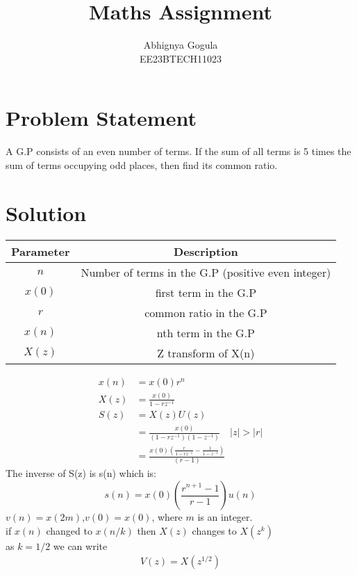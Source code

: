 \documentclass{article}
\begin{document}
\title{Maths Assignment}
\author{Abhignya Gogula\\
        EE23BTECH11023}
\maketitle
\section*{Problem Statement}
A G.P consists of an even number of terms. If the sum of all terms is 5 times the sum of terms occupying odd places, then find its common ratio.
\section*{Solution}
\begin{table}[h!]
\centering
\begin{tabular}{|c|c|}
\hline
Parameter & Description \\
\hline
\( n \) & Number of terms in the G.P (positive even integer) \\
\hline
\(x(0) \) & first term in the G.P \\
\hline
\( r \) & common ratio in the G.P \\
\hline
\( x(n) \) & nth term in the G.P \\
\hline
\( X(z) \) & Z transform of X(n) \\
\hline
\end{tabular}
\end{table}
\begin{align}
x(n) &= x(0)r^n \\
X(z) &= \frac{x(0)}{1-rz^{-1}} \\
S(z) &= X(z)U(z) \\
     &= \frac{x(0)}{(1-rz^{-1})(1-z^{-1})} \quad \lvert z \rvert > \lvert r \rvert \\
     &= \frac{x(0)(\frac{r}{1-rz^{-1}}-\frac{1}{1-z^{-1}})}{(r-1)}
\end{align}
The inverse of S(z) is s(n) which is:
\begin{equation}
s(n) = x(0)(\frac{r^{n+1}-1}{r-1})u(n)
\label{eq:eq1}
\end{equation}
\(v(n)=x(2m)\),\(v(0)=x(0)\), where \(m\) is an integer.\\
if $x(n)$ changed to $x(n/k)$ then $X(z)$ changes to $X(z^k)$\\
as $k=1/2$ we can write 
\begin{align}
V(z)=X(z^{1/2})
\end{align}
\end{document}
